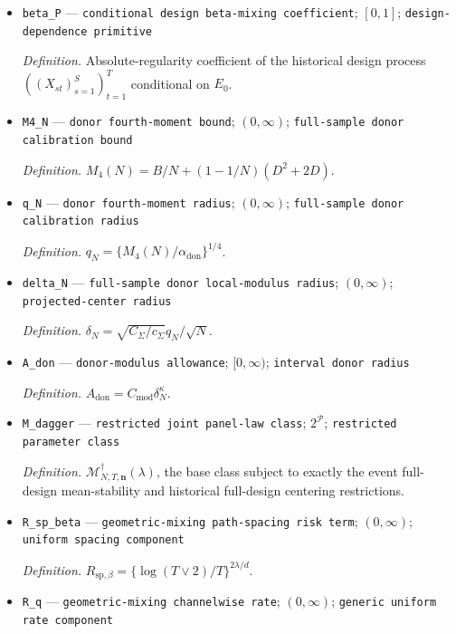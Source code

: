 \documentclass{article}
\begin{document}
\begin{itemize}
  \item \texttt{beta\_\allowbreak{}P} --- \texttt{conditional design beta-\allowbreak{}mixing coefficient}; \([0,1]\); \texttt{design-\allowbreak{}dependence primitive}
  \par\smallskip\noindent\emph{Definition.} Absolute-regularity coefficient of the historical design process \(((X_{st})_{s=1}^{S})_{t=1}^{T}\) conditional on \(E_0\).
  \item \texttt{M4\_\allowbreak{}N} --- \texttt{donor fourth-\allowbreak{}moment bound}; \((0,\infty)\); \texttt{full-\allowbreak{}sample donor calibration bound}
  \par\smallskip\noindent\emph{Definition.} \(M_4(N)=B/N+(1-1/N)(D^2+2D)\).
  \item \texttt{q\_\allowbreak{}N} --- \texttt{donor fourth-\allowbreak{}moment radius}; \((0,\infty)\); \texttt{full-\allowbreak{}sample donor calibration radius}
  \par\smallskip\noindent\emph{Definition.} \(q_N=\{M_4(N)/\alpha_{\mathrm{don}}\}^{1/4}\).
  \item \texttt{delta\_\allowbreak{}N} --- \texttt{full-\allowbreak{}sample donor local-\allowbreak{}modulus radius}; \((0,\infty)\); \texttt{projected-\allowbreak{}center radius}
  \par\smallskip\noindent\emph{Definition.} \(\delta_N=\sqrt{C_\Sigma/c_\Sigma}q_N/\sqrt N\).
  \item \texttt{A\_\allowbreak{}don} --- \texttt{donor-\allowbreak{}modulus allowance}; \([0,\infty)\); \texttt{interval donor radius}
  \par\smallskip\noindent\emph{Definition.} \(A_{\mathrm{don}}=C_{\mathrm{mod}}\delta_N^\kappa\).
  \item \texttt{M\_\allowbreak{}dagger} --- \texttt{restricted joint panel-\allowbreak{}law class}; \(2^{\mathcal P}\); \texttt{restricted parameter class}
  \par\smallskip\noindent\emph{Definition.} \(\mathcal M_{N,T,\mathbf n}^{\dagger}(\lambda)\), the base class subject to exactly the event full-design mean-stability and historical full-design centering restrictions.
  \item \texttt{R\_\allowbreak{}sp\_\allowbreak{}beta} --- \texttt{geometric-\allowbreak{}mixing path-\allowbreak{}spacing risk term}; \((0,\infty)\); \texttt{uniform spacing component}
  \par\smallskip\noindent\emph{Definition.} \(R_{\mathrm{sp},\beta}=\{\log(T\vee2)/T\}^{2\lambda/d}\).
  \item \texttt{R\_\allowbreak{}q} --- \texttt{geometric-\allowbreak{}mixing channelwise rate}; \((0,\infty)\); \texttt{generic uniform rate component}

\end{itemize}
\end{document}
